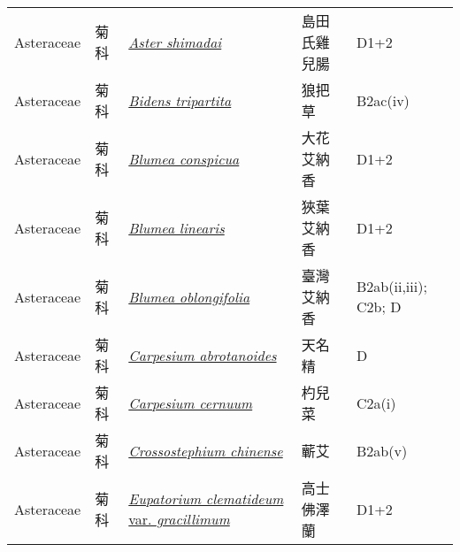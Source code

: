 {\begin{longtable}{L{2.5cm}L{2cm}L{5cm}L{2.5cm}L{3cm}}
    Asteraceae & 菊科 & \href{http://www.theplantlist.org/tpl1.1/search?q=Aster+shimadai}{\textit{Aster shimadai} } & 島田氏雞兒腸 & D1+2    \\
    Asteraceae & 菊科 & \href{http://www.theplantlist.org/tpl1.1/search?q=Bidens+tripartita}{\textit{Bidens tripartita} } & 狼把草 & B2ac(iv)    \\
    Asteraceae & 菊科 & \href{http://www.theplantlist.org/tpl1.1/search?q=Blumea+conspicua}{\textit{Blumea conspicua} } & 大花艾納香 & D1+2    \\
    Asteraceae & 菊科 & \href{http://www.theplantlist.org/tpl1.1/search?q=Blumea+linearis}{\textit{Blumea linearis} } & 狹葉艾納香 & D1+2    \\
    Asteraceae & 菊科 & \href{http://www.theplantlist.org/tpl1.1/search?q=Blumea+oblongifolia}{\textit{Blumea oblongifolia} } & 臺灣艾納香 & B2ab(ii,iii); C2b; D    \\
    Asteraceae & 菊科 & \href{http://www.theplantlist.org/tpl1.1/search?q=Carpesium+abrotanoides}{\textit{Carpesium abrotanoides} } & 天名精 & D    \\
    Asteraceae & 菊科 & \href{http://www.theplantlist.org/tpl1.1/search?q=Carpesium+cernuum}{\textit{Carpesium cernuum} } & 杓兒菜 & C2a(i)    \\
    Asteraceae & 菊科 & \href{http://www.theplantlist.org/tpl1.1/search?q=Crossostephium+chinense}{\textit{Crossostephium chinense} } & 蘄艾 & B2ab(v)    \\
    Asteraceae & 菊科 & \href{http://www.theplantlist.org/tpl1.1/search?q=Eupatorium+clematideum+var.+gracillimum}{\textit{Eupatorium clematideum} var. \textit{gracillimum} } & 高士佛澤蘭 & D1+2    \\

\end{longtable}}

